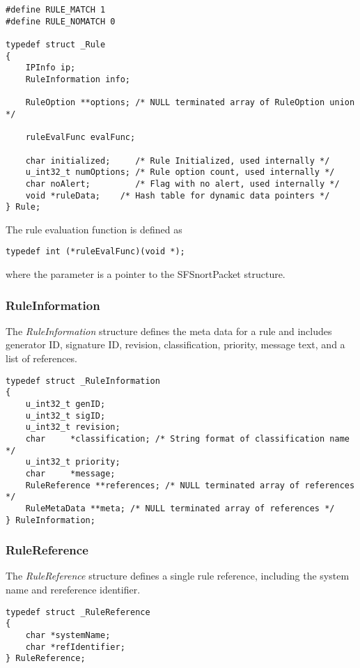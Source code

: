 \documentclass[english]{report}
\begin{document}
\begin{verbatim}
#define RULE_MATCH 1
#define RULE_NOMATCH 0

typedef struct _Rule
{
    IPInfo ip;
    RuleInformation info;

    RuleOption **options; /* NULL terminated array of RuleOption union */

    ruleEvalFunc evalFunc;

    char initialized;     /* Rule Initialized, used internally */
    u_int32_t numOptions; /* Rule option count, used internally */
    char noAlert;         /* Flag with no alert, used internally */
    void *ruleData;    /* Hash table for dynamic data pointers */
} Rule;
\end{verbatim}

The rule evaluation function is defined as

\begin{verbatim}
typedef int (*ruleEvalFunc)(void *);
\end{verbatim}

where the parameter is a pointer to the SFSnortPacket structure.

\subsubsection{RuleInformation}

The {\em RuleInformation} structure defines the meta data for a rule and
includes generator ID, signature ID, revision, classification, priority,
message text, and a list of references.

\begin{verbatim}
typedef struct _RuleInformation
{
    u_int32_t genID;
    u_int32_t sigID;
    u_int32_t revision;
    char     *classification; /* String format of classification name */
    u_int32_t priority;
    char     *message;
    RuleReference **references; /* NULL terminated array of references */
    RuleMetaData **meta; /* NULL terminated array of references */
} RuleInformation;
\end{verbatim}

\subsubsection{RuleReference}

The {\em RuleReference} structure defines a single rule reference, including
the system name and rereference identifier.

\begin{verbatim}
typedef struct _RuleReference
{
    char *systemName;
    char *refIdentifier;
} RuleReference;
\end{verbatim}
\end{document}
